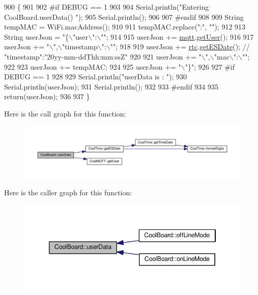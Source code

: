 \begin{DoxyCode}
900 \{
901 
902 \textcolor{preprocessor}{#if DEBUG == 1}
903 
904     Serial.println(\textcolor{stringliteral}{"Entering CoolBoard.userData() "});
905     Serial.println();
906 
907 \textcolor{preprocessor}{#endif}
908 
909     String tempMAC = WiFi.macAddress();
910 
911     tempMAC.replace(\textcolor{stringliteral}{":"}, \textcolor{stringliteral}{""});
912 
913     String userJson = \textcolor{stringliteral}{"\{\(\backslash\)"user\(\backslash\)":\(\backslash\)""};
914 
915     userJson += \hyperlink{classCoolBoard_a2399f44d7c23c1149a335cb3b46d90f1}{mqtt}.\hyperlink{classCoolMQTT_a373cc92fca7760d886f02d8a6e5b3f63}{getUser}();
916 
917     userJson += \textcolor{stringliteral}{"\(\backslash\)",\(\backslash\)"timestamp\(\backslash\)":\(\backslash\)""};
918 
919     userJson += \hyperlink{classCoolBoard_a50d2a6716879d64a85f3c6b44ad63275}{rtc}.\hyperlink{classCoolTime_ac4f32ee513c1328d984306645e8785a4}{getESDate}(); \textcolor{comment}{// "timestamp":"20yy-mm-ddThh:mm:ssZ"}
920 
921     userJson += \textcolor{stringliteral}{"\(\backslash\)",\(\backslash\)"mac\(\backslash\)":\(\backslash\)""};
922 
923     userJson += tempMAC;
924 
925     userJson += \textcolor{stringliteral}{"\(\backslash\)"\}"};
926 
927 \textcolor{preprocessor}{#if DEBUG == 1}
928 
929     Serial.println(\textcolor{stringliteral}{"userData is : "});
930     Serial.println(userJson);
931     Serial.println();
932 
933 \textcolor{preprocessor}{#endif  }
934     
935     \textcolor{keywordflow}{return}(userJson);
936     
937 \}
\end{DoxyCode}
Here is the call graph for this function\+:
\nopagebreak
\begin{figure}[H]
\begin{center}
\leavevmode
\includegraphics[width=350pt]{classCoolBoard_ae7358fb6e623cfc81b775f5f1734909b_cgraph}
\end{center}
\end{figure}
Here is the caller graph for this function\+:
\nopagebreak
\begin{figure}[H]
\begin{center}
\leavevmode
\includegraphics[width=346pt]{classCoolBoard_ae7358fb6e623cfc81b775f5f1734909b_icgraph}
\end{center}
\end{figure}


